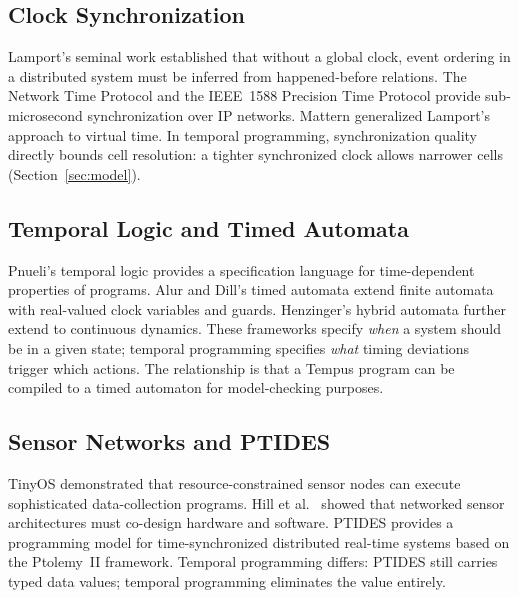 \documentclass[twocolumn,10pt]{article}
\begin{document}
\subsection{Clock Synchronization}

Lamport's seminal work \cite{lamport1978clocks} established that
without a global clock, event ordering in a distributed system must
be inferred from happened-before relations. The Network Time Protocol
\cite{mills1991ntp} and the IEEE~1588 Precision Time Protocol
\cite{ieee1588} provide sub-microsecond synchronization over IP
networks. Mattern \cite{mattern1989virtualtime} generalized Lamport's
approach to virtual time. In temporal programming, synchronization
quality directly bounds cell resolution: a tighter synchronized clock
allows narrower cells (Section~\ref{sec:model}).

\subsection{Temporal Logic and Timed Automata}

Pnueli's temporal logic \cite{pnueli1977temporal} provides a
specification language for time-dependent properties of programs.
Alur and Dill's timed automata \cite{alur1994timed} extend finite
automata with real-valued clock variables and guards. Henzinger's
hybrid automata \cite{henzinger1996hybrid} further extend to
continuous dynamics. These frameworks specify \emph{when} a system
should be in a given state; temporal programming specifies
\emph{what} timing deviations trigger which actions. The relationship
is that a Tempus program can be compiled to a timed automaton for
model-checking purposes.

\subsection{Sensor Networks and PTIDES}

TinyOS \cite{levis2005tinyos} demonstrated that resource-constrained
sensor nodes can execute sophisticated data-collection programs.
Hill et al.\ \cite{hill2000sensor} showed that networked sensor
architectures must co-design hardware and software. PTIDES
\cite{zhao2007ptides} provides a programming model for
time-synchronized distributed real-time systems based on the
Ptolemy~II framework. Temporal programming differs: PTIDES
still carries typed data values; temporal programming eliminates
the value entirely.

\end{document}
